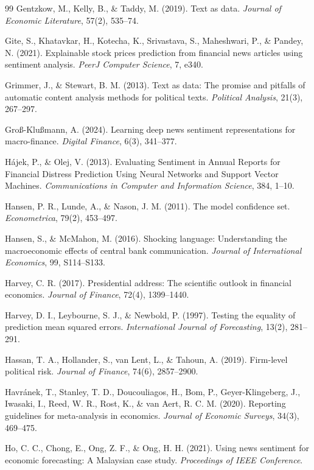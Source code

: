 \documentclass[11pt,twocolumn]{article}
\begin{document}
\begin{thebibliography}{99}
 Gentzkow, M., Kelly, B., \& Taddy, M. (2019). Text as data. \textit{Journal of Economic Literature}, 57(2), 535--74.

 Gite, S., Khatavkar, H., Kotecha, K., Srivastava, S., Maheshwari, P., \& Pandey, N. (2021). Explainable stock prices prediction from financial news articles using sentiment analysis. \textit{PeerJ Computer Science}, 7, e340.

 Grimmer, J., \& Stewart, B. M. (2013). Text as data: The promise and pitfalls of automatic content analysis methods for political texts. \textit{Political Analysis}, 21(3), 267--297.

 Gro{\ss}-Klu{\ss}mann, A. (2024). Learning deep news sentiment representations for macro-finance. \textit{Digital Finance}, 6(3), 341--377.

 H\'ajek, P., \& Olej, V. (2013). Evaluating Sentiment in Annual Reports for Financial Distress Prediction Using Neural Networks and Support Vector Machines. \textit{Communications in Computer and Information Science}, 384, 1--10.

 Hansen, P. R., Lunde, A., \& Nason, J. M. (2011). The model confidence set. \textit{Econometrica}, 79(2), 453--497.

 Hansen, S., \& McMahon, M. (2016). Shocking language: Understanding the macroeconomic effects of central bank communication. \textit{Journal of International Economics}, 99, S114--S133.

 Harvey, C. R. (2017). Presidential address: The scientific outlook in financial economics. \textit{Journal of Finance}, 72(4), 1399--1440.

 Harvey, D. I., Leybourne, S. J., \& Newbold, P. (1997). Testing the equality of prediction mean squared errors. \textit{International Journal of Forecasting}, 13(2), 281--291.

 Hassan, T. A., Hollander, S., van Lent, L., \& Tahoun, A. (2019). Firm-level political risk. \textit{Journal of Finance}, 74(6), 2857--2900.

 Havr\'anek, T., Stanley, T. D., Doucouliagos, H., Bom, P., Geyer-Klingeberg, J., Iwasaki, I., Reed, W. R., Rost, K., \& van Aert, R. C. M. (2020). Reporting guidelines for meta-analysis in economics. \textit{Journal of Economic Surveys}, 34(3), 469--475.

 Ho, C. C., Chong, E., Ong, Z. F., \& Ong, H. H. (2021). Using news sentiment for economic forecasting: A Malaysian case study. \textit{Proceedings of IEEE Conference}.


\end{thebibliography}
\end{document}
